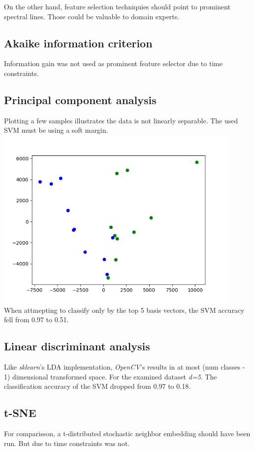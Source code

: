 \documentclass{article}
\begin{document}
On the other hand, feature selection techniquies should point to prominent spectral lines.
Those could be valuable to domain experts.


\subsection{Akaike information criterion}
Information gain was not used as prominent feature selector due to time constraints.


\subsection{Principal component analysis}
Plotting a few samples illustrates the data is not linearly separable.
The used SVM must be using a soft margin.
\\
\includegraphics[width=0.9\textwidth]{img/pca}
\\
When attmepting to classify only by the top 5 basis vectors, the SVM accuracy fell from 0.97 to 0.51.


\subsection{Linear discriminant analysis}
Like \textit{sklearn}'s LDA implementation, \textit{OpenCV}'s results in at most (num classes - 1) dimensional transformed space.
For the examined dataset \textit{d=5}.
The classification accuracy of the SVM dropped from 0.97 to 0.18.


\subsection{t-SNE}
For comparisson, a t-distributed stochastic neighbor embedding should have been run.
But due to time constraints was not.
\end{document}
